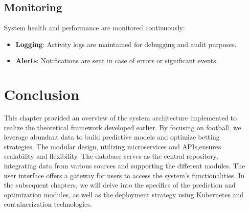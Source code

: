 \subsection{Monitoring}

System health and performance are monitored continuously:

\begin{itemize}
    \item \textbf{Logging}: Activity logs are maintained for debugging and audit purposes.
    \item \textbf{Alerts}: Notifications are sent in case of errors or significant events.
\end{itemize}


\section{Conclusion}

This chapter provided an overview of the system architecture implemented to realize the theoretical framework developed earlier. By focusing on football, we leverage abundant data to build predictive models and optimize betting strategies. The modular design, utilizing microservices and APIs,ensures scalability and flexibility. The database serves as the central repository, integrating data from various sources and supporting the different modules. The user interface offers a gateway for users to access the system's functionalities. In the subsequent chapters, we will delve into the specifics of the prediction and optimization modules, as well as the deployment strategy using Kubernetes and containerization technologies.
